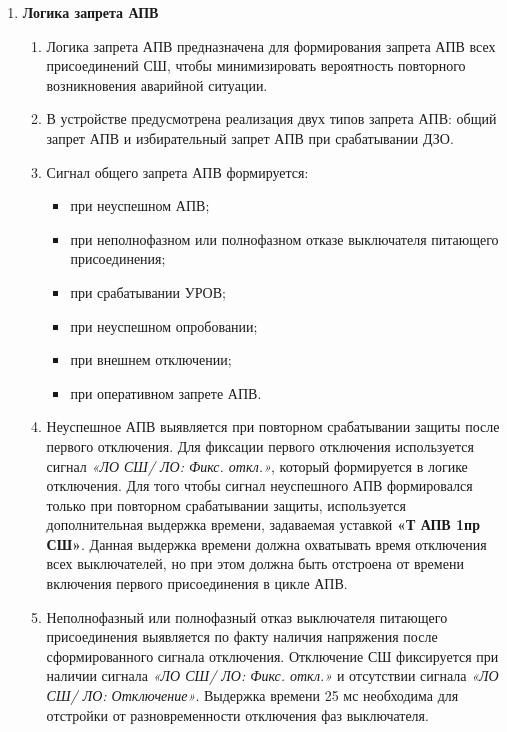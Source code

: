 \begin{enumerate}
\begin{enumerate}
\end{enumerate}


\item \textbf{Логика запрета АПВ}

\begin{enumerate}

\item
Логика запрета АПВ предназначена для формирования запрета АПВ всех присоединений СШ, чтобы минимизировать вероятность повторного возникновения аварийной ситуации. 

\item
В устройстве предусмотрена реализация двух типов запрета АПВ: общий запрет АПВ и избирательный запрет АПВ при срабатывании ДЗО.

\item
Сигнал общего запрета АПВ формируется:
\begin{itemize}
\item при неуспешном АПВ;
\item при неполнофазном или полнофазном отказе выключателя питающего присоединения;
\item при срабатывании УРОВ;
\item при неуспешном опробовании;
\item при внешнем отключении;
\item при оперативном запрете АПВ.
\end{itemize}

\item
Неуспешное АПВ выявляется при повторном срабатывании защиты после первого отключения. Для фиксации первого отключения используется сигнал \textit{«ЛО СШ/ ЛО: Фикс. откл.»}, который формируется в логике отключения. Для того чтобы сигнал неуспешного АПВ формировался только при повторном срабатывании защиты, используется дополнительная выдержка времени, задаваемая уставкой \textbf{«Т АПВ 1пр СШ»}.
Данная выдержка времени должна охватывать время отключения всех выключателей, но при этом должна быть отстроена от времени включения первого присоединения в цикле АПВ.

\item
Неполнофазный или полнофазный отказ выключателя питающего присоединения выявляется по факту наличия напряжения после сформированного сигнала отключения. Отключение СШ фиксируется при наличии сигнала \textit{«ЛО СШ/ ЛО: Фикс. откл.»} и отсутствии сигнала \textit{«ЛО СШ/ ЛО: Отключение»}. Выдержка времени 25 мс необходима для отстройки от разновременности отключения фаз выключателя.


\end{enumerate}
\end{enumerate}
